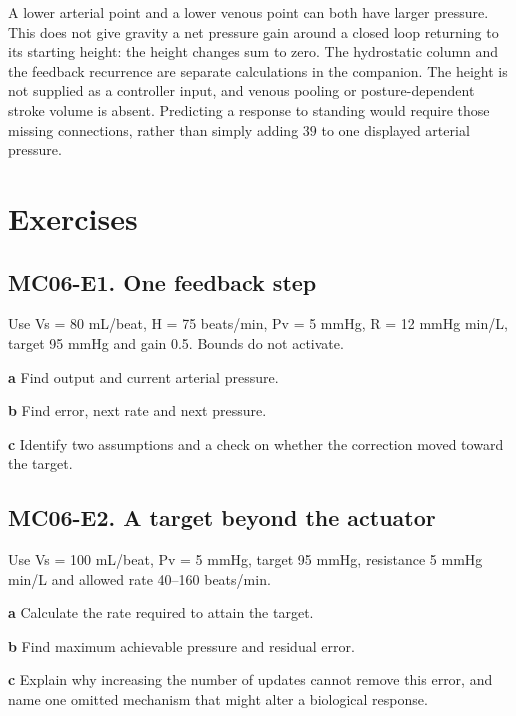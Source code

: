 \documentclass[11pt,letterpaper]{article}
\theoremstyle{definition}\newtheorem{definition}{Definition}\newtheorem{example}{Example}
\numberwithin{equation}{section}
\begin{document}
A lower arterial point and a lower venous point can both have larger pressure. This does not give gravity a net pressure gain around a closed loop returning to its starting height: the height changes sum to zero. The hydrostatic column and the feedback recurrence are separate calculations in the companion. The height is not supplied as a controller input, and venous pooling or posture-dependent stroke volume is absent. Predicting a response to standing would require those missing connections, rather than simply adding $39$ to one displayed arterial pressure.
\bigskip
\section*{Exercises}
\par\noindent\begin{minipage}{\linewidth}
\subsection*{MC06-E1. One feedback step}
Use Vs =\allowbreak{} 80 mL/beat, H =\allowbreak{} 75 beats/min, Pv =\allowbreak{} 5 mmHg, R =\allowbreak{} 12 mmHg min/L, target 95 mmHg and gain 0.5. Bounds do not activate.

\textbf{a} Find output and current arterial pressure.

\end{minipage}\par\medskip
\textbf{b} Find error, next rate and next pressure.

\textbf{c} Identify two assumptions and a check on whether the correction moved toward the target.

\par\noindent\begin{minipage}{\linewidth}
\subsection*{MC06-E2. A target beyond the actuator}
Use Vs =\allowbreak{} 100 mL/beat, Pv =\allowbreak{} 5 mmHg, target 95 mmHg, resistance 5 mmHg min/L and allowed rate 40--160 beats/min.

\textbf{a} Calculate the rate required to attain the target.

\end{minipage}\par\medskip
\textbf{b} Find maximum achievable pressure and residual error.

\textbf{c} Explain why increasing the number of updates cannot remove this error, and name one omitted mechanism that might alter a biological response.
\end{document}
